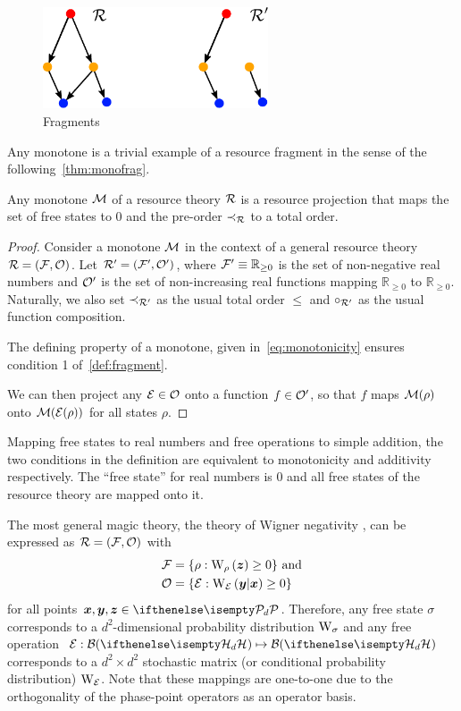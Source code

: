 \begin{figure}
    \centering
    \includegraphics[height=3cm]{sections/major/fragments.pdf}
    \caption{Fragments 
    }
    \label{fig:fragments}
\end{figure}

Any monotone is a trivial example of a resource fragment in the sense of the following~\cref{thm:monofrag}.
\begin{proposition}\label{thm:monofrag}
	Any monotone $\cal{M}$ of a resource theory $\R$ is a resource projection that maps the set of free states to $0$ and the pre-order $\prec_\R$ to a total order.
\end{proposition}
\begin{proof}
	Consider a monotone $\cal{M}$ in the context of a general resource theory $\R = (\F, \O)$.
	Let $\R' = (\F', \O')$, where $\F' \equiv \mathbb{R}_{\geq 0}$ is the set of non-negative real numbers and $\O'$ is the set of non-increasing real functions mapping $\mathbb{R}_{\geq 0}$ to $\mathbb{R}_{\geq 0}$. 
	Naturally, we also set $\prec_{\R'}$ as the usual total order $\leq$ and $\circ_{\R'}$ as the usual function composition.
	
	The defining property of a monotone, given in~\cref{eq:monotonicity} ensures condition 1 of~\cref{def:fragment}.
	
	We can then project any $\E \in \O$ onto a function $f \in \O'$, so that $f$ maps $\cal{M}(\rho)$ onto $\cal{M}(\E(\rho))$ for all states $\rho$.
	
\end{proof}
Mapping free states to real numbers and free operations to simple addition, the two conditions in the definition are equivalent to monotonicity and additivity respectively.
The ``free state'' for real numbers is 0 and all free states of the resource theory are mapped onto it.

The most general magic theory, the theory of Wigner negativity , can be expressed as $\R = (\F, \O)$ with
\begin{align}
    \F &= \{ \rho: \W[\bmz]{\rho} \geq 0\}\ \text{and} \\
    \O &= \{ \E: \W[\bmy|\bmx]{\E} \geq 0\}
\end{align}
for all points $\bmx, \bmy, \bmz \in \pd$.
Therefore, any free state $\sigma$ corresponds to a $d^2$-dimensional probability distribution $\W{\sigma}$ and any free operation $\E: \cal{B}(\hd) \mapsto \cal{B}(\hd)$ corresponds to a $d^2 \times d^2$ stochastic matrix (or conditional probability distribution) $\W{\E}$.
Note that these mappings are one-to-one due to the orthogonality of the phase-point operators as an operator basis.

